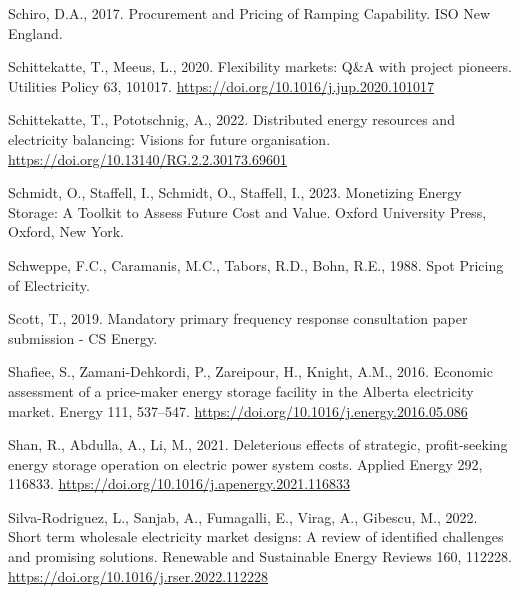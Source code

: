 \documentclass[12pt,a4paper,]{report}
\newlength{\cslhangindent}
\newenvironment{CSLReferences}[2] %
 {%
  \setlength{\parindent}{0pt}
  \ifodd #1 \everypar{\setlength{\hangindent}{\cslhangindent}}\ignorespaces\fi
  \ifnum #2 > 0
  \setlength{\parskip}{#2\baselineskip}
  \fi
 }%
 {}
\begin{document}
\begin{CSLReferences}{1}{0}
\leavevmode{}%
Schiro, D.A., 2017. Procurement and {Pricing} of {Ramping Capability}.
{ISO New England}.

\leavevmode{}%
Schittekatte, T., Meeus, L., 2020. Flexibility markets: {Q}\&{A} with
project pioneers. Utilities Policy 63, 101017.
\url{https://doi.org/10.1016/j.jup.2020.101017}

\leavevmode{}%
Schittekatte, T., Pototschnig, A., 2022. Distributed energy resources
and electricity balancing: Visions for future organisation.
\url{https://doi.org/10.13140/RG.2.2.30173.69601}

\leavevmode{}%
Schmidt, O., Staffell, I., Schmidt, O., Staffell, I., 2023. Monetizing
{Energy Storage}: {A Toolkit} to {Assess Future Cost} and {Value}.
{Oxford University Press}, {Oxford, New York}.

\leavevmode{}%
Schweppe, F.C., Caramanis, M.C., Tabors, R.D., Bohn, R.E., 1988. Spot
{Pricing} of {Electricity}.

\leavevmode{}%
Scott, T., 2019. Mandatory primary frequency response consultation paper
submission - {CS Energy}.

\leavevmode{}%
Shafiee, S., Zamani-Dehkordi, P., Zareipour, H., Knight, A.M., 2016.
Economic assessment of a price-maker energy storage facility in the
{Alberta} electricity market. Energy 111, 537--547.
\url{https://doi.org/10.1016/j.energy.2016.05.086}

\leavevmode{}%
Shan, R., Abdulla, A., Li, M., 2021. Deleterious effects of strategic,
profit-seeking energy storage operation on electric power system costs.
Applied Energy 292, 116833.
\url{https://doi.org/10.1016/j.apenergy.2021.116833}

\leavevmode{}%
Silva-Rodriguez, L., Sanjab, A., Fumagalli, E., Virag, A., Gibescu, M.,
2022. Short term wholesale electricity market designs: {A} review of
identified challenges and promising solutions. Renewable and Sustainable
Energy Reviews 160, 112228.
\url{https://doi.org/10.1016/j.rser.2022.112228}


\end{CSLReferences}
\end{document}

